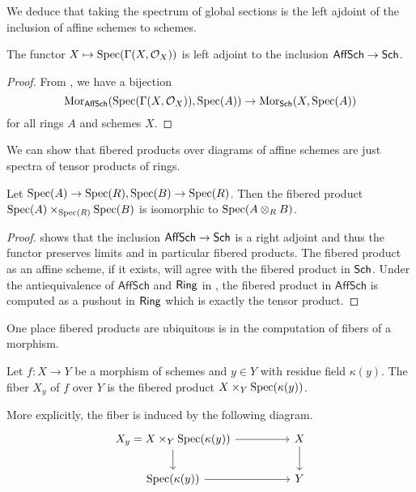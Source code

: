 We deduce that taking the spectrum of global sections is the left ajdoint of the inclusion of affine schemes to schemes. 
\begin{corollary}\label{corr: spectra of global sections is left adjoint of the inclusion}
    The functor $X\mapsto\operatorname{Spec}(\Gamma(X,\mathcal{O}_{X}))$ is left adjoint to the inclusion $\mathsf{AffSch}\to\mathsf{Sch}$. 
\end{corollary}
\begin{proof}
    From , we have a bijection $$\mathrm{Mor}_{\mathsf{AffSch}}(\operatorname{Spec}(\Gamma(X,\mathcal{O}_{X})),\operatorname{Spec}(A))\to\mathrm{Mor}_{\mathsf{Sch}}(X,\operatorname{Spec}(A))$$
    for all rings $A$ and schemes $X$.  
\end{proof}
We can show that fibered products over diagrams of affine schemes are just spectra of tensor products of rings. 
\begin{proposition}\label{prop: fibered products of affine schemes}
    Let $\operatorname{Spec}(A)\to\operatorname{Spec}(R),\operatorname{Spec}(B)\to\operatorname{Spec}(R)$. Then the fibered product $\operatorname{Spec}(A)\times_{\operatorname{Spec}(R)}\operatorname{Spec}(B)$ is isomorphic to $\operatorname{Spec}(A\otimes_{R}B)$. 
\end{proposition}
\begin{proof}
     shows that the inclusion $\mathsf{AffSch}\to\mathsf{Sch}$ is a right adjoint and thus the functor preserves limits and in particular fibered products. The fibered product as an affine scheme, if it exists, will agree with the fibered product in $\mathsf{Sch}$. Under the antiequivalence of $\mathsf{AffSch}$ and $\mathsf{Ring}$ in , the fibered product in $\mathsf{AffSch}$ is computed as a pushout in $\mathsf{Ring}$ which is exactly the tensor product. 
\end{proof}
One place fibered products are ubiquitous is in the computation of fibers of a morphism. 
\begin{definition}[Fiber]\label{def: fiber of morphism}
    Let $f:X\to Y$ be a morphism of schemes and $y\in Y$ with residue field $\kappa(y)$. The fiber $X_{y}$ of $f$ over $Y$ is the fibered product $X\times_{Y}\operatorname{Spec}(\kappa(y))$. 
\end{definition}
More explicitly, the fiber is induced by the following diagram.
$$%
\begin{tikzcd}
	{X_{y}=X\times_{Y}\spec(\kappa(y))} && X \\
	{\spec(\kappa(y))} && Y
	\arrow[from=1-1, to=1-3]
	\arrow[from=1-1, to=2-1]
	\arrow[from=1-3, to=2-3]
	\arrow[from=2-1, to=2-3]
\end{tikzcd}$$
